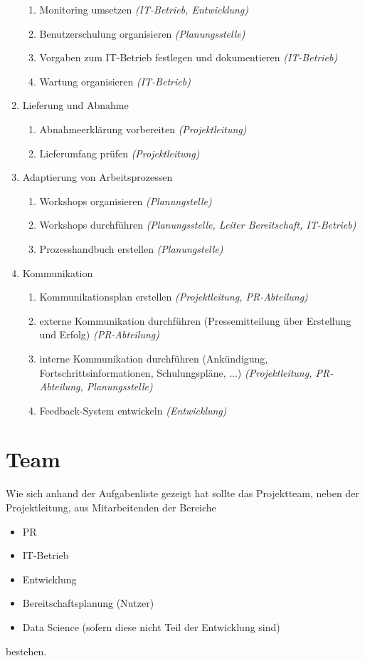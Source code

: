 \begin{enumerate}
\begin{enumerate}
			\item Monitoring umsetzen \textit{(IT-Betrieb, Entwicklung)}
			\item Benutzerschulung organisieren \textit{(Planungsstelle)}
			\item Vorgaben zum IT-Betrieb festlegen und dokumentieren \textit{(IT-Betrieb)}
			\item Wartung organisieren \textit{(IT-Betrieb)}
		\end{enumerate}
	\item Lieferung und Abnahme
		\begin{enumerate}
			\item Abnahmeerklärung vorbereiten \textit{(Projektleitung)}
			\item Lieferumfang prüfen \textit{(Projektleitung)}
		\end{enumerate}			
	\item Adaptierung von Arbeitsprozessen
		\begin{enumerate}
			\item Workshops organisieren \textit{(Planungstelle)}
			\item Workshops durchführen \textit{(Planungsstelle, Leiter Bereitschaft, IT-Betrieb) }
			\item Prozesshandbuch erstellen \textit{(Planungstelle)}
		\end{enumerate}
	\item Kommunikation
		\begin{enumerate}
			\item Kommunikationsplan erstellen \textit{(Projektleitung, PR-Abteilung)}
			\item externe Kommunikation durchführen (Pressemitteilung über Erstellung und Erfolg) \textit{(PR-Abteilung)}
			\item interne Kommunikation durchführen (Ankündigung, Fortschrittsinformationen, Schulungspläne, ...) \textit{(Projektleitung, PR-Abteilung, Planungsstelle)}
			\item Feedback-System entwickeln \textit{(Entwicklung)}
		\end{enumerate}
\end{enumerate}


\section{Team}

Wie sich anhand der Aufgabenliste gezeigt hat sollte das Projektteam, neben der Projektleitung, aus Mitarbeitenden der Bereiche
\begin{itemize}
	\itemsep-8pt
	\item PR
	\item IT-Betrieb
	\item Entwicklung
	\item Bereitschaftsplanung (Nutzer)
	\item Data Science (sofern diese nicht Teil der Entwicklung sind)
\end{itemize}	
bestehen.

